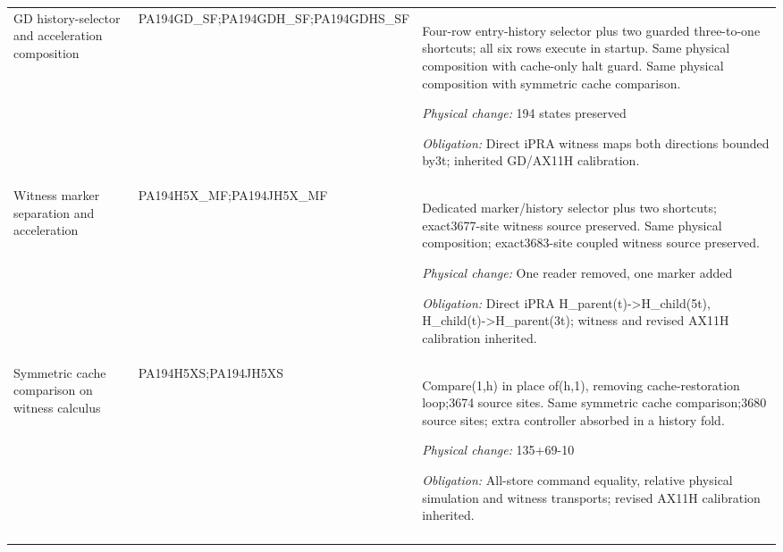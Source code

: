 {\begin{longtable}{@{}>{\raggedright\arraybackslash}p{}>{\raggedright\arraybackslash}p{}>{\raggedright\arraybackslash}p{}@{}}
GD history-selector and acceleration composition & PA194GD\_SF;\allowbreak PA194GDH\_SF;\allowbreak PA194GDHS\_SF & Four-row entry-history selector plus two guarded three-to-one shortcuts; all six rows execute in startup. Same physical composition with cache-only halt guard. Same physical composition with symmetric cache comparison.\par\emph{Physical change:} 194 states preserved\par\emph{Obligation:} Direct iPRA witness maps both directions bounded by3t; inherited GD/AX11H calibration.\\\addlinespace
Witness marker separation and acceleration & PA194H5X\_MF;\allowbreak PA194JH5X\_MF & Dedicated marker/history selector plus two shortcuts; exact3677-site witness source preserved. Same physical composition; exact3683-site coupled witness source preserved.\par\emph{Physical change:} One reader removed, one marker added\par\emph{Obligation:} Direct iPRA H\_parent(t)->H\_child(5t), H\_child(t)->H\_parent(3t); witness and revised AX11H calibration inherited.\\\addlinespace
Symmetric cache comparison on witness calculus & PA194H5XS;\allowbreak PA194JH5XS & Compare(1,h) in place of(h,1), removing cache-restoration loop;3674 source sites. Same symmetric cache comparison;3680 source sites; extra controller absorbed in a history fold.\par\emph{Physical change:} 135+69-10\par\emph{Obligation:} All-store command equality, relative physical simulation and witness transports; revised AX11H calibration inherited.\\\addlinespace
\bottomrule\end{longtable}}
